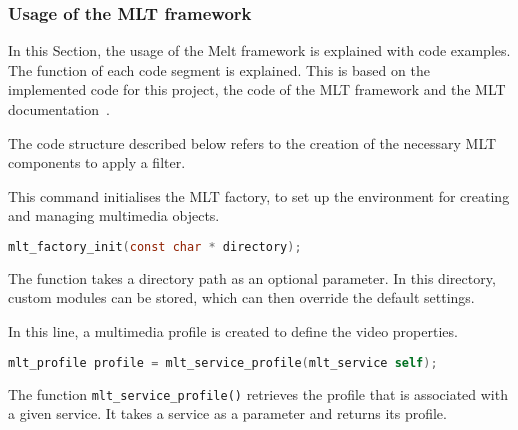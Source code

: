 \documentclass[../MasterThesis.tex]{subfiles}
\begin{document}
\subsubsection*{Usage of the MLT framework}

In this Section, the usage of the Melt framework is explained with code examples. The function of each code segment is explained.
This is based on the implemented code for this project, the code of the MLT framework and the MLT documentation~\cite{melt_code, melt}.

The code structure described below refers to the creation of the necessary MLT components to apply a filter.


\begin{description}[font=\color{RedViolet!80!black}, style=nextline]
	
	\item[Initialise the factory] 
	
	This command initialises the MLT factory, to set up the environment for creating and managing multimedia objects.
	
	\begin{lstlisting}[language=C, numbers=none, columns=fullflexible, belowskip=0pt, aboveskip=9pt]
	mlt_factory_init(const char * directory); \end{lstlisting}

	The function takes a directory path as an optional parameter. In this directory, custom modules can be stored, which can then override the default settings. %
	
	
	\item[Create a profile]
	
	In this line, a multimedia profile is created to define the video properties.
	
	\begin{lstlisting}[language=C, numbers=none, columns=fullflexible, belowskip=0pt, aboveskip=9pt]
	mlt_profile profile = mlt_service_profile(mlt_service self); \end{lstlisting}
	
	The function \texttt{mlt\_service\_profile()} retrieves the profile that is associated with a given service. It takes a service as a parameter and returns its profile.
	
	


	\item[Create a producer] 


\end{description}
\end{document}
